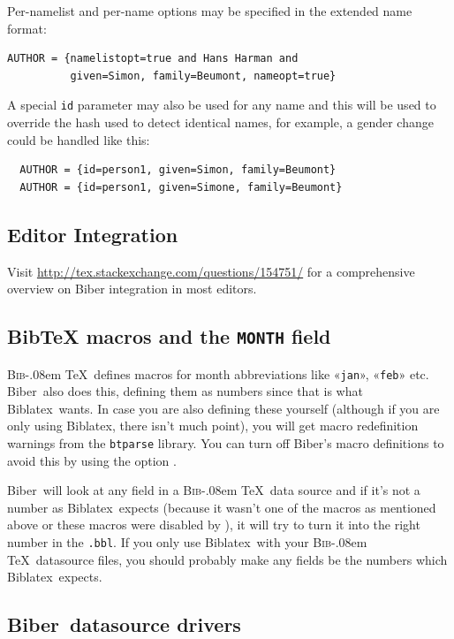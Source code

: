\documentclass{ltxdockit}
\def\BibTeX{\textsc{Bib}\kern-.08em \TeX}
\newcommand*{\biber}{Biber\xspace}
\newcommand*{\biblatex}{Biblatex\xspace}
\begin{document}
%
Per-namelist and per-name options may be specified in the extended name
format:
\begin{verbatim}
AUTHOR = {namelistopt=true and Hans Harman and
          given=Simon, family=Beumont, nameopt=true}
\end{verbatim}
%
A special \verb+id+ parameter may also be used for any name and this will be
used to override the hash used to detect identical names, for example, a
gender change could be handled like this:
\begin{verbatim}
  AUTHOR = {id=person1, given=Simon, family=Beumont}
  AUTHOR = {id=person1, given=Simone, family=Beumont}
\end{verbatim}

\bigskip
\subsection{Editor Integration}

Visit \url{http://tex.stackexchange.com/questions/154751/} for a
comprehensive overview on \biber integration in most editors.

\subsection{BibTeX macros and the \texttt{MONTH} field}

\BibTeX\ defines macros for month abbreviations
like «\verb+jan+», «\verb+feb+» etc. \biber\ also does this,
defining them as numbers since that is what \biblatex\ wants. In
case you are also defining these yourself (although if you are only
using \biblatex, there isn't much point), you will get macro
redefinition warnings from the \verb+btparse+ library. You can turn
off \biber's macro definitions to avoid this by using the option
.

\biber\ will look at any  field in a \BibTeX\ data
source and if it's not a number as \biblatex\ expects (because it
wasn't one of the macros as mentioned above or these macros were disabled
by ), it will try to turn it into the right number in
the \verb+.bbl+. If you only use \biblatex\ with your \BibTeX\
datasource files, you should probably make any  fields be the
numbers which \biblatex\ expects.

\subsection{\biber\ datasource drivers}\label{dsd}
\end{document}
